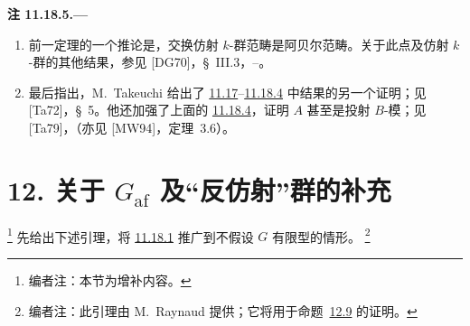 

\medskip
{}\label{rem:sga3-VIB-11.18.5}%
\noindent\textbf{注 11.18.5.---}
\begin{enumerate}
\item[\textup{(a)}]\label{rem:sga3-VIB-11.18.5-a}%
  前一定理的一个推论是，交换仿射 \(k\)-群范畴是阿贝尔范畴。关于此点及仿射 \(k\)-群的其他结果，参见 \textup{[DG70]}，\S~III.3，--。

\item[\textup{(b)}]\label{rem:sga3-VIB-11.18.5-b}%
  最后指出，M.~Takeuchi 给出了 \hyperref[thm:sga3-VIB-11.17]{11.17}--\hyperref[cor:sga3-VIB-11.18.4]{11.18.4} 中结果的另一个证明；见 \textup{[Ta72]}，\S~5。他还加强了上面的 \hyperref[concl:sga3-VIB-11.18.4-i]{11.18.4}\textup{}，证明 \(A\) 甚至是投射 \(B\)-模；见 \textup{[Ta79]}，\textup{（亦见 [MW94]，定理~3.6）}。
\end{enumerate}

\section*{12. 关于 \(G_{\mathrm{af}}\) 及“反仿射”群的补充}
\label{sec:sga3-VIB-12}%

\footnote{\label{note:sga3-VIB-135}编者注：本节为增补内容。}
先给出下述引理，将 \hyperref[lem:sga3-VIB-11.18.1]{11.18.1} 推广到不假设 \(G\) 有限型的情形。%
\footnote{\label{note:sga3-VIB-136}编者注：此引理由 M.~Raynaud 提供；它将用于命题~\hyperref[prop:sga3-VIB-12.9]{12.9} 的证明。}

